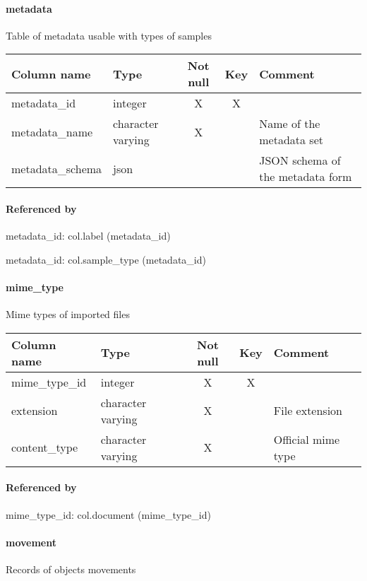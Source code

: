 \paragraph{metadata}
Table of metadata usable with types of samples

\begin{tabular}{|l| p{2cm}|c|c| p{5cm}|}
\hline
Column name & Type & Not null & Key & Comment \\
\hline
metadata\_id & integer & X & X & \\
metadata\_name & character varying & X &  & Name of the metadata set\\
metadata\_schema & json &  &  & JSON schema of the metadata form\\
\hline
\end{tabular}
\paragraph{Referenced by}
metadata\_id: col.label (metadata\_id)

metadata\_id: col.sample\_type (metadata\_id)

\paragraph{mime\_type}
Mime types of imported files

\begin{tabular}{|l| p{2cm}|c|c| p{5cm}|}
\hline
Column name & Type & Not null & Key & Comment \\
\hline
mime\_type\_id & integer & X & X & \\
extension & character varying & X &  & File extension\\
content\_type & character varying & X &  & Official mime type\\
\hline
\end{tabular}
\paragraph{Referenced by}
mime\_type\_id: col.document (mime\_type\_id)

\paragraph{movement}
Records of objects movements

